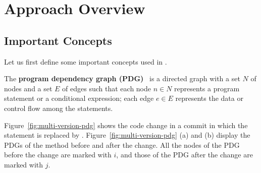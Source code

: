 \section{Approach Overview}
\label{overview:sec}

\subsection{Important Concepts}
\label{concepts:sec}



Let us first define some important concepts used in {\tool}.


\begin{Definition}
The \textbf{program dependency graph (PDG)}~\cite{pdg} is a directed
graph with a set $N$ of nodes and a set $E$ of edges such that each
node $n \in N$ represents a program statement or a conditional
expression; each edge $e \in E$ represents the data or control flow
among the statements.
\end{Definition}


Figure~\ref{fig:multi-version-pdg} shows the code change in a commit
in which the statement  is replaced by
. Figure~\ref{fig:multi-version-pdg} (a) and
(b) display the PDGs of the method  before and after
the change. All the nodes of the PDG before the change are marked with
$i$, and those of the PDG after the change are marked with $j$.


